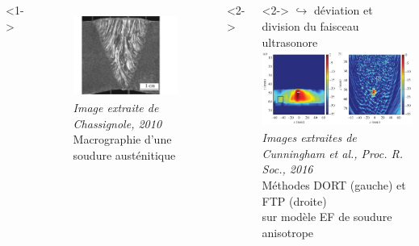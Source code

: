 \documentclass[10pt,xcolor=x11names,compress, notes=show]{beamer}%
\begin{document}
\subsection*{}
\begin{frame}{\insertsectionhead}
\begin{small}
\vspace{-0.5cm}
\hspace{1cm}
	\begin{columns}[c]
			<1->
			\centering
			\begin{figure}
				\includegraphics[height=2.7cm]{./img/soudure1.png}\\
				{\tiny{ \itshape Image extraite de Chassignole, 2010} \\ \centering \scriptsize Macrographie d'une soudure austénitique  }
			\end{figure}
			<2->
			\hspace{-2.8cm}
			\vspace{2.5cm}
			<2->
			\hspace{-1cm}
			$\hookrightarrow$ déviation et division du faisceau ultrasonore\\[0.2cm]
			\hspace{-0.5cm}
			\hspace{1cm}\includegraphics[height=2.5cm]{img/tfm_dort.png}\\
			{\tiny{ \itshape Images extraites de Cunningham et al., Proc. R. Soc., 2016} \\[0.2cm] \hspace{1cm} \scriptsize Méthodes DORT (gauche) et FTP (droite)\\[-0.1cm] \hspace{1.5cm}sur modèle EF de soudure anisotrope }
				

\end{columns}
\end{small}
\end{frame}
\end{document}
